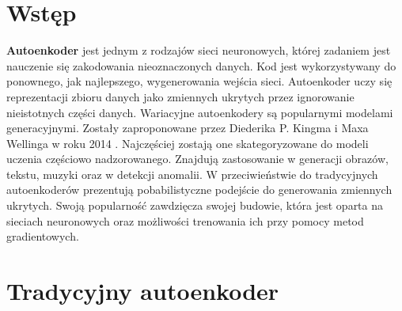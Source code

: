 \documentclass[a4paper,12pt,oneside]{book} %
\begin{document}
\sloppy

\thispagestyle{empty}



\tableofcontents{}

\chapter*{Wstęp} %
\textbf{Autoenkoder} jest jednym z rodzajów sieci neuronowych, której zadaniem jest nauczenie się zakodowania nieoznaczonych danych. Kod jest wykorzystywany do ponownego, jak najlepszego, wygenerowania wejścia sieci. Autoenkoder uczy się reprezentacji zbioru danych jako zmiennych ukrytych przez ignorowanie nieistotnych części danych.
Wariacyjne autoenkodery są popularnymi modelami generacyjnymi. Zostały zaproponowane przez Diederika P. Kingma i Maxa Wellinga w roku 2014 \cite{kingma2014autoencoding}. Najczęściej zostają one skategoryzowane do modeli uczenia częściowo nadzorowanego. Znajdują zastosowanie w generacji obrazów, tekstu, muzyki oraz w detekcji anomalii. W przeciwieństwie do tradycyjnych autoenkoderów prezentują pobabilistyczne podejście do generowania zmiennych ukrytych. Swoją popularność zawdzięcza swojej budowie, która jest oparta na sieciach neuronowych oraz możliwości trenowania ich przy pomocy metod gradientowych.
\chapter{Tradycyjny autoenkoder} 
\end{document}
